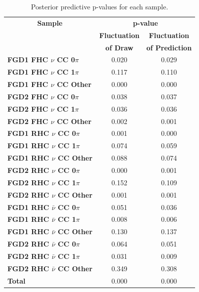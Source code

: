 \begin{center}
\begin{table}
\center
\begin{tabular}{l||c c}
\hline \hline
\multicolumn{1}{c||}{\textbf{Sample}} & \multicolumn{2}{c}{\textbf{p-value}} \\
& \multicolumn{1}{c}{\textbf{Fluctuation}} & \multicolumn{1}{c}{\textbf{Fluctuation}} \\
& \multicolumn{1}{c}{\textbf{of Draw}} & \multicolumn{1}{c}{\textbf{of Prediction}} \\
\hline\hline
\textbf{FGD1 FHC $\nu$ CC 0$\pi$} & 0.020 & 0.029\\ 
\textbf{FGD1 FHC $\nu$ CC 1$\pi$} & 0.117 & 0.110\\
\textbf{FGD1 FHC $\nu$ CC Other} & 0.000 & 0.000\\ \hline
\textbf{FGD2 FHC $\nu$ CC 0$\pi$} & 0.038 & 0.037\\ 
\textbf{FGD2 FHC $\nu$ CC 1$\pi$} & 0.036 & 0.036\\ 
\textbf{FGD2 FHC $\nu$ CC Other} & 0.002 & 0.001\\ \hline
\textbf{FGD1 RHC $\nu$ CC 0$\pi$} & 0.001 & 0.000\\
\textbf{FGD1 RHC $\nu$ CC 1$\pi$} & 0.074 & 0.059\\
\textbf{FGD1 RHC $\nu$ CC Other} & 0.088 & 0.074\\ \hline
\textbf{FGD2 RHC $\nu$ CC 0$\pi$} & 0.000 & 0.001\\
\textbf{FGD2 RHC $\nu$ CC 1$\pi$} & 0.152 & 0.109\\
\textbf{FGD2 RHC $\nu$ CC Other} & 0.001 & 0.001\\ \hline
\textbf{FGD1 RHC $\bar{\nu}$ CC 0$\pi$} & 0.051 & 0.036\\
\textbf{FGD1 RHC $\bar{\nu}$ CC 1$\pi$} & 0.008 & 0.006\\
\textbf{FGD1 RHC $\bar{\nu}$ CC Other} & 0.130 & 0.137\\
\textbf{FGD2 RHC $\bar{\nu}$ CC 0$\pi$} & 0.064 & 0.051\\
\textbf{FGD2 RHC $\bar{\nu}$ CC 1$\pi$} & 0.031 & 0.009\\
\textbf{FGD2 RHC $\bar{\nu}$ CC Other} & 0.349 & 0.308\\ \hline
\textbf{Total} & 0.000 & 0.000 \\ \hline\hline
\end{tabular}
\caption{Posterior predictive p-values for each sample.}
\label{tab:pval}
\end{table}
\end{center}

